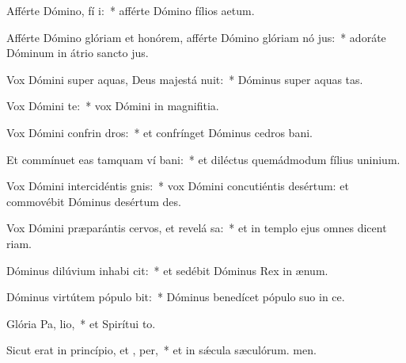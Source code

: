 \item Afférte Dómino, fí i:~* afférte Dómino fílios aetum.
\item Afférte Dómino glóriam et honórem, afférte Dómino glóriam nó jus:~* adoráte Dóminum in átrio sancto jus.
\item Vox Dómini super aquas, Deus majestá nuit:~* Dóminus super aquas tas.
\item Vox Dómini  te:~* vox Dómini in magnifitia.
\item Vox Dómini confrin dros:~* et confrínget Dóminus cedros bani.
\item Et commínuet eas tamquam ví bani:~* et diléctus quemádmodum fílius uninium.
\item Vox Dómini intercidéntis  gnis:~* vox Dómini concutiéntis desértum: et commovébit Dóminus desértum des.
\item Vox Dómini præparántis cervos, et revelá sa:~* et in templo ejus omnes dicent riam.
\item Dóminus dilúvium inhabi cit:~* et sedébit Dóminus Rex in ænum.
\item Dóminus virtútem pópulo  bit:~* Dóminus benedícet pópulo suo in ce.
\item Glória Pa,  lio,~* et Spirítui to.
\item Sicut erat in princípio, et ,  per,~* et in sǽcula sæculórum. men.
